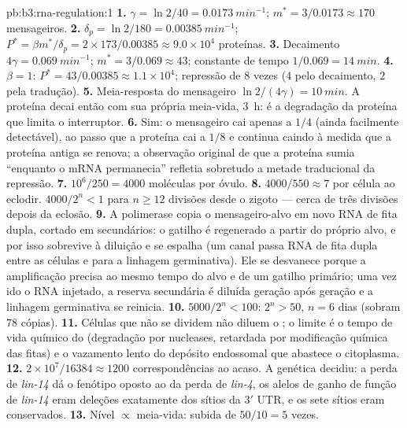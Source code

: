 \begin{solution}{pb:b3:rna-regulation:1}
\textbf{1.} $\gamma = \ln 2/40 = \qty{0.0173}{min^{-1}}$; $m^{*} =
3/0.0173 \approx 170$ mensageiros.
\textbf{2.} $\delta_{p} = \ln 2/180 = \qty{0.00385}{min^{-1}}$; $P^{*} =
\beta m^{*}/\delta_{p} = 2\times 173/0.00385 \approx 9.0\times 10^{4}$
proteínas.
\textbf{3.} Decaimento $4\gamma = \qty{0.069}{min^{-1}}$; $m^{*} = 3/0.069
\approx 43$; constante de tempo $1/0.069 = \qty{14}{min}$.
\textbf{4.} $\beta = 1$: $P^{*} = 43/0.00385 \approx 1.1\times 10^{4}$;
repressão de $8$ vezes ($4$ pelo decaimento, $2$ pela tradução).
\textbf{5.} Meia-resposta do mensageiro $\ln 2/(4\gamma) = \qty{10}{min}$.
A proteína decai então com sua própria meia-vida, \qty{3}{h}: é a
degradação da proteína que limita o interruptor.
\textbf{6.} Sim: o mensageiro cai apenas a $1/4$ (ainda facilmente
detectável), ao passo que a proteína cai a $1/8$ e continua caindo à
medida que a proteína antiga se renova; a observação original de que a
proteína sumia ``enquanto o mRNA permanecia'' refletia sobretudo a
metade traducional da repressão.
\textbf{7.} $10^{6}/250 = 4000$ moléculas por óvulo.
\textbf{8.} $4000/550 \approx 7$ por célula ao eclodir. $4000/2^{n} < 1$
para $n \ge 12$ divisões desde o zigoto --- cerca de três divisões
depois da eclosão.
\textbf{9.} A polimerase copia o mensageiro-alvo em novo RNA de fita
dupla, cortado em  secundários: o gatilho é regenerado a partir do
próprio alvo, e por isso sobrevive à diluição e se espalha (um canal
passa RNA de fita dupla entre as células e para a linhagem germinativa).
Ele se desvanece porque a amplificação precisa ao mesmo tempo do alvo e
de um gatilho primário; uma vez ido o RNA injetado, a reserva secundária
é diluída geração após geração e a linhagem germinativa se reinicia.
\textbf{10.} $5000/2^{n} < 100$: $2^{n} > 50$, $n = 6$ dias (sobram $78$
cópias).
\textbf{11.} Células que não se dividem não diluem o ; o limite é o
tempo de vida químico do  (degradação por nucleases, retardada por
modificação química das fitas) e o vazamento lento do depósito endossomal
que abastece o citoplasma.
\textbf{12.} $2\times 10^{7}/\num{16384} \approx \num{1200}$
correspondências ao acaso. A genética decidiu: a perda de \emph{lin-14}
dá o fenótipo oposto ao da perda de \emph{lin-4}, os alelos de ganho de
função de \emph{lin-14} eram deleções exatamente dos sítios da 3$'$ UTR,
e os sete sítios eram conservados.
\textbf{13.} Nível $\propto$ meia-vida: subida de $50/10 = 5$ vezes.

\end{solution}
